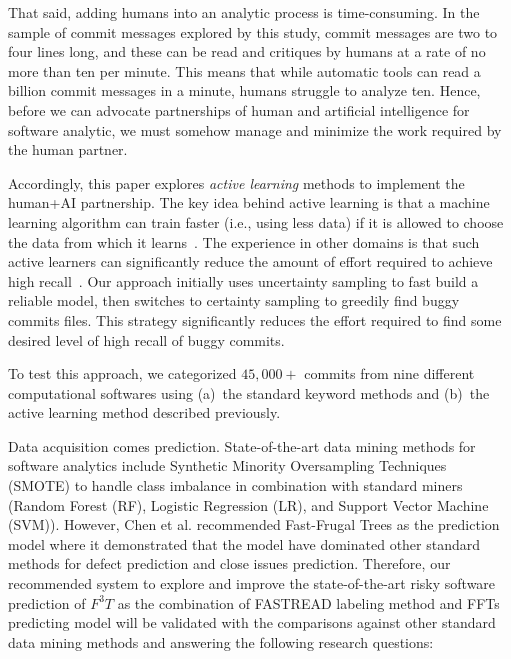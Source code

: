 \documentclass[sigconf,review, anonymous]{acmart}
\begin{document}
That said,  adding humans into an analytic process is time-consuming. In the sample of commit messages explored by this study, commit messages are two to four lines long, and these can be read and critiques by humans at a rate of no more than ten per minute. This means that while automatic tools can read a billion commit messages in a minute, humans struggle to analyze ten. Hence, before we can advocate partnerships of human and artificial intelligence for software analytic, we must somehow manage and minimize the work required by the human partner.

Accordingly, this paper explores {\em active learning} methods to implement the human+AI partnership. The key idea behind active learning is that a machine learning algorithm can train faster (i.e., using less data) if it is allowed to choose the data from which it learns~\cite{settles2012active}. The experience in other domains is that such active learners can significantly reduce the amount of effort required to achieve high recall~\cite{Cormack2017Navigating, Cormack2016Engineering, cormack2016scalability, Cormack2015Autonomy, Cormack2014Evaluation, Wallace2010Semi, wallace2010active, wallace2011should, wallace2012class, nguyen2015combining, Yu2018Recall}. Our approach initially uses uncertainty sampling to fast build a reliable model, then switches to certainty sampling to greedily find buggy commits files. This strategy significantly reduces the effort required to find some desired level of high recall of buggy commits.

To test this approach, we categorized $45,000+$ commits from nine different computational softwares using (a)~the standard keyword methods and (b)~the active learning method described previously. 

Data acquisition comes prediction.  State-of-the-art data mining methods for software analytics include Synthetic Minority Oversampling Techniques (SMOTE) to handle class imbalance \cite{agrawal2018better, kamei12_jit} in combination with standard miners (Random Forest (RF), Logistic Regression (LR), and Support Vector Machine (SVM)). However, Chen et al. \cite{di18_fft} recommended Fast-Frugal Trees as the prediction model where it demonstrated that the model have dominated other standard methods for defect prediction and close issues prediction. Therefore, our recommended system to explore and improve the state-of-the-art risky software prediction of $F^3T$ as the combination of FASTREAD labeling method and FFTs predicting model will be validated with the comparisons against other standard data mining methods and answering the following research questions:
\end{document}
